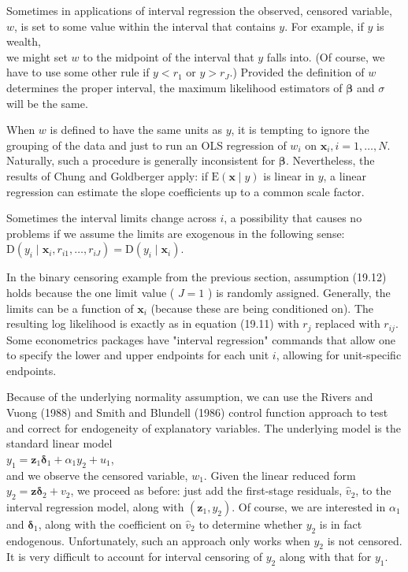 \documentclass[10pt]{article}
\begin{document}
Sometimes in applications of interval regression the observed, censored variable, $w$, is set to some value within the interval that contains $y$. For example, if $y$ is wealth,\\
we might set $w$ to the midpoint of the interval that $y$ falls into. (Of course, we have to use some other rule if $y<r_{1}$ or $y>r_{J}$.) Provided the definition of $w$ determines the proper interval, the maximum likelihood estimators of $\boldsymbol{\beta}$ and $\sigma$ will be the same.

When $w$ is defined to have the same units as $y$, it is tempting to ignore the grouping of the data and just to run an OLS regression of $w_{i}$ on $\mathbf{x}_{i}, i=1, \ldots, N$. Naturally, such a procedure is generally inconsistent for $\boldsymbol{\beta}$. Nevertheless, the results of Chung and Goldberger apply: if $\mathrm{E}(\mathbf{x} \mid y)$ is linear in $y$, a linear regression can estimate the slope coefficients up to a common scale factor.

Sometimes the interval limits change across $i$, a possibility that causes no problems if we assume the limits are exogenous in the following sense:\\
$\mathrm{D}\left(y_{i} \mid \mathbf{x}_{i}, r_{i 1}, \ldots, r_{i J}\right)=\mathrm{D}\left(y_{i} \mid \mathbf{x}_{i}\right)$.

In the binary censoring example from the previous section, assumption (19.12) holds because the one limit value ( $J=1$ ) is randomly assigned. Generally, the limits can be a function of $\mathbf{x}_{i}$ (because these are being conditioned on). The resulting log likelihood is exactly as in equation (19.11) with $r_{j}$ replaced with $r_{i j}$. Some econometrics packages have "interval regression" commands that allow one to specify the lower and upper endpoints for each unit $i$, allowing for unit-specific endpoints.

Because of the underlying normality assumption, we can use the Rivers and Vuong (1988) and Smith and Blundell (1986) control function approach to test and correct for endogeneity of explanatory variables. The underlying model is the standard linear model\\
$y_{1}=\mathbf{z}_{1} \boldsymbol{\delta}_{1}+\alpha_{1} y_{2}+u_{1}$,\\
and we observe the censored variable, $w_{1}$. Given the linear reduced form $y_{2}= \mathbf{z} \boldsymbol{\delta}_{2}+v_{2}$, we proceed as before: just add the first-stage residuals, $\hat{v}_{2}$, to the interval regression model, along with $\left(\mathbf{z}_{1}, y_{2}\right)$. Of course, we are interested in $\alpha_{1}$ and $\boldsymbol{\delta}_{1}$, along with the coefficient on $\hat{v}_{2}$ to determine whether $y_{2}$ is in fact endogenous. Unfortunately, such an approach only works when $y_{2}$ is not censored. It is very difficult to account for interval censoring of $y_{2}$ along with that for $y_{1}$.
\end{document}
